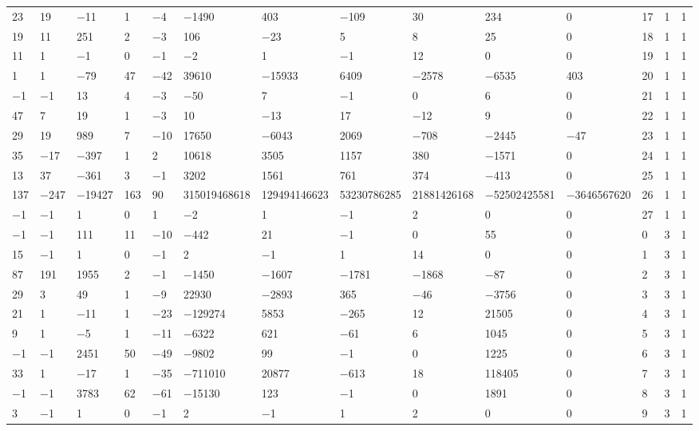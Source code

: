 \documentclass[10pt,a4paper]{amsart}
\numberwithin{equation}{section}
\theoremstyle{definition}
\numberwithin{table}{section}
\begin{document}
{\begin{paracol}{3}
\begin{supertabular}{|w{c}{.32cm}w{c}{.32cm}w{c}{.32cm}@{\hspace{.5cm}}w{c}{.2cm}w{c}{.2cm}|@{\hspace{\tabcolsep}}HHHHHHw{c}{.17cm}w{c}{.17cm}w{c}{.17cm}|}
			23 & 19 & $-$11 & 1 & $-$4 & $-$1490 & 403 & $-$109 & 30 & 234 & 0 & 17 & 1 & 1 \\
			19 & 11 & 251 & 2 & $-$3 & 106 & $-$23 & 5 & 8 & 25 & 0 & 18 & 1 & 1 \\
			11 & 1 & $-$1 & 0 & $-$1 & $-$2 & 1 & $-$1 & 12 & 0 & 0 & 19 & 1 & 1 \\
			1 & 1 & $-$79 & 47 & $-$42 & 39610 & $-$15933 & 6409 & $-$2578 & $-$6535 & 403 & 20 & 1 & 1 \\
			$-$1 & $-$1 & 13 & 4 & $-$3 & $-$50 & 7 & $-$1 & 0 & 6 & 0 & 21 & 1 & 1 \\
			47 & 7 & 19 & 1 & $-$3 & 10 & $-$13 & 17 & $-$12 & 9 & 0 & 22 & 1 & 1 \\
			29 & 19 & 989 & 7 & $-$10 & 17650 & $-$6043 & 2069 & $-$708 & $-$2445 & $-$47 & 23 & 1 & 1 \\
			35 & $-$17 & $-$397 & 1 & 2 & 10618 & 3505 & 1157 & 380 & $-$1571 & 0 & 24 & 1 & 1 \\
			13 & 37 & $-$361 & 3 & $-$1 & 3202 & 1561 & 761 & 374 & $-$413 & 0 & 25 & 1 & 1 \\
			137 & $-$247 & $-$19427 & 163 & 90 & 315019468618 & 129494146623 & 53230786285 & 21881426168 & $-$52502425581 & $-$3646567620 & 26 & 1 & 1 \\
			$-$1 & $-$1 & 1 & 0 & 1 & $-$2 & 1 & $-$1 & 2 & 0 & 0 & 27 & 1 & 1 \\
			$-$1 & $-$1 & 111 & 11 & $-$10 & $-$442 & 21 & $-$1 & 0 & 55 & 0 & 0 & 3 & 1 \\
			15 & $-$1 & 1 & 0 & $-$1 & 2 & $-$1 & 1 & 14 & 0 & 0 & 1 & 3 & 1 \\
			87 & 191 & 1955 & 2 & $-$1 & $-$1450 & $-$1607 & $-$1781 & $-$1868 & $-$87 & 0 & 2 & 3 & 1 \\
			29 & 3 & 49 & 1 & $-$9 & 22930 & $-$2893 & 365 & $-$46 & $-$3756 & 0 & 3 & 3 & 1 \\
			21 & 1 & $-$11 & 1 & $-$23 & $-$129274 & 5853 & $-$265 & 12 & 21505 & 0 & 4 & 3 & 1 \\
			9 & 1 & $-$5 & 1 & $-$11 & $-$6322 & 621 & $-$61 & 6 & 1045 & 0 & 5 & 3 & 1 \\
			$-$1 & $-$1 & 2451 & 50 & $-$49 & $-$9802 & 99 & $-$1 & 0 & 1225 & 0 & 6 & 3 & 1 \\
			33 & 1 & $-$17 & 1 & $-$35 & $-$711010 & 20877 & $-$613 & 18 & 118405 & 0 & 7 & 3 & 1 \\
			$-$1 & $-$1 & 3783 & 62 & $-$61 & $-$15130 & 123 & $-$1 & 0 & 1891 & 0 & 8 & 3 & 1 \\
			3 & $-$1 & 1 & 0 & $-$1 & 2 & $-$1 & 1 & 2 & 0 & 0 & 9 & 3 & 1 \\

\end{supertabular}
\end{paracol}}
\end{document}
